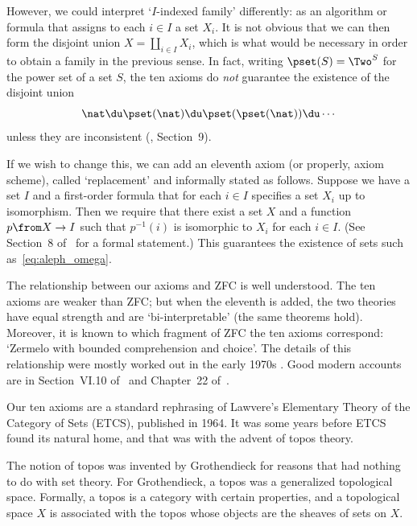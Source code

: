 \documentclass[12pt]{article}
\begin{document}
However, we could interpret `$I$-indexed family' differently: as an
algorithm or formula that assigns to each $i \in I$ a set $X_i$.  It is not
obvious that we can then form the disjoint union $X = \coprod_{i \in I}
X_i$, which is what would be necessary in order to obtain a family in the
previous sense.  In fact, writing $\pset(S) = \Two^S$ for the power set of
a set $S$, the ten axioms do \emph{not} guarantee the existence of the
disjoint union
% 
\begin{equation}        \label{eq:aleph_omega}
\nat \du \pset(\nat) \du \pset(\pset(\nat)) 
\du \cdots 
\end{equation}
% 
unless they are inconsistent (\cite{MathSML}, Section~9).

If we wish to change this, we can add an eleventh axiom (or properly, axiom
scheme), called `replacement' and informally stated as follows.  Suppose we
have a set $I$ and a first-order formula that for each $i \in I$ specifies
a set $X_i$ up to isomorphism.  Then we require that there exist a set $X$
and a function $p \from X \to I$ such that $p^{-1}(i)$ is isomorphic to
$X_i$ for each $i \in I$.  (See Section~8 of~\cite{McLaECS} for a formal
statement.)  This guarantees the existence of sets such
as~\eqref{eq:aleph_omega}.

The relationship between our axioms and ZFC is well understood.  The ten
axioms are weaker than ZFC; but when the eleventh is added, the two
theories have equal strength and are `bi-interpretable' (the same theorems
hold).  Moreover, it is known to which fragment of ZFC the ten axioms
correspond: `Zermelo with bounded comprehension and choice'.  The details
of this relationship were mostly worked out in the early 1970s
\cite{Cole,MitcBTT,Osiu}.  Good modern accounts are in Section~VI.10
of~\cite{MaMo} and Chapter~22 of~\cite{McLaECET}.


Our ten axioms are a standard rephrasing of Lawvere's Elementary Theory of
the Category of Sets (ETCS), published in 1964.  It was some years before
ETCS found its natural home, and that was with the advent of topos theory.

The notion of topos was invented by Grothendieck for reasons that had
nothing to do with set theory.  For Grothendieck, a topos was a generalized
topological space.  Formally, a topos is a category with
certain properties, and a topological space $X$ is associated with the
topos whose objects are the sheaves of sets on $X$.  
\end{document}
